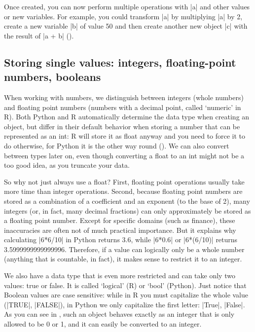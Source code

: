 Once created, you can now perform multiple operations
with |a| and other values or new variables. For example, you
could transform |a| by multiplying |a| by 2, create a new
variable |b| of value 50 and then create another new object
|c| with the result of |a + b| ().





\subsection{Storing single values: integers, floating-point numbers, booleans}

When working with numbers, we distinguish between integers (whole
numbers) and floating point numbers (numbers with a decimal point,
called `numeric' in R). Both Python and R automatically determine the
data type when creating an object, but differ in their default
behavior when storing a number that can be represented as an int: R
will store it as float anyway and you need to force it to do
otherwise, for Python it is the other way round
(). We can also convert between types later on,
even though converting a float to an int might not be a too good idea,
as you truncate your data.

So why not just always use a float? First,
floating point operations usually take more time than integer operations.
Second, because floating point numbers are stored as a combination of
a coefficient and an exponent (to the base of 2), many integers (or,
in fact, many decimal fractions) can only approximately be stored
as a floating point number. Except for specific domains (such
as finance), these inaccuracies are often not of much practical importance.
But it explains why calculating |6*6/10| in Python returns 3.6, while
|6*0.6| or |6*(6/10)| returns 3.5999999999999996. Therefore, if
a value can logically only be a whole number (anything that is
countable, in fact), it makes sense to restrict it to an integer.

We also have a data type that is even more restricted and can take
only two values: true or false. It is called `logical' (R) or `bool'
(Python).  Just notice that Boolean values are case sensitive:
while in R you must capitalize the whole value (|TRUE|, |FALSE|), in
Python we only capitalize the first letter: |True|, |False|.  As you can
see in , such an object behaves exactly as an integer that
is only allowed to be 0 or 1, and it can easily be converted to an
integer.

